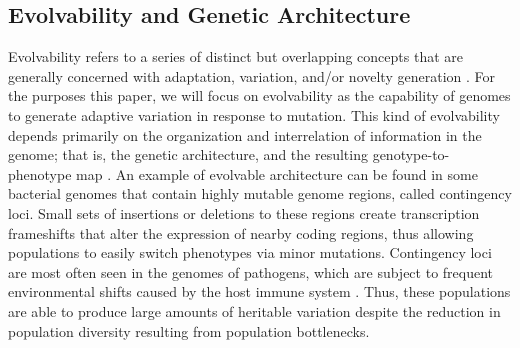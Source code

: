 \documentclass[letterpaper]{article}
\begin{document}
\subsection{Evolvability and Genetic Architecture}
Evolvability refers to a series of distinct but overlapping concepts that are generally concerned with adaptation, variation, and/or novelty generation \citep{pigliucci_is_2008}. For the purposes this paper, we will focus on evolvability as the capability of genomes to generate adaptive variation in response to mutation. This kind of evolvability depends primarily on the organization and interrelation of information in the genome; that is, the genetic architecture, and the resulting genotype-to-phenotype map \citep{gunter_p._wagner_perspective:_1996}. An example of evolvable architecture can be found in some bacterial genomes that contain highly mutable genome regions, called contingency loci. Small sets of insertions or deletions to these regions create transcription frameshifts that alter the expression of nearby coding regions, thus allowing populations to easily switch phenotypes via minor mutations. Contingency loci are most often seen in the genomes of pathogens, which are subject to frequent environmental shifts caused by the host immune system \citep{bayliss_simple_2001}. Thus, these populations are able to produce large amounts of heritable variation despite the reduction in population diversity resulting from population bottlenecks.
%
%
%
%
%
\end{document}

